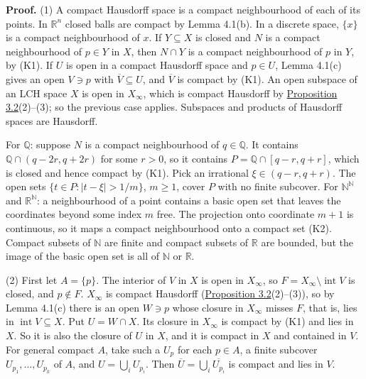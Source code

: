 \documentclass[
  english,
  11pt,
  a4paper,
]{article}
\begin{document}
\textbf{Proof.} (1) A compact Hausdorff space is a compact neighbourhood
of each of its points. In \(\mathbb R^n\) closed balls are compact by
Lemma 4.1(b). In a discrete space, \(\{x\}\) is a compact neighbourhood
of \(x\). If \(Y\subseteq X\) is closed and \(N\) is a compact
neighbourhood of \(p\in Y\) in \(X\), then \(N\cap Y\) is a compact
neighbourhood of \(p\) in \(Y\), by (K1). If \(U\) is open in a compact
Hausdorff space and \(p\in U\), Lemma 4.1(c) gives an open \(V\ni p\)
with \(\overline V\subseteq U\), and \(\overline V\) is compact by (K1).
An open subspace of an LCH space \(X\) is open in \(X_\infty\), which is
compact Hausdorff by
\hyperlink{the-stone-weierstrass-theorem-for-functions-vanishing-at-infinity--oa-fnd-sw-02}{Proposition
3.2}(2)--(3); so the previous case applies. Subspaces and products of
Hausdorff spaces are Hausdorff.

For \(\mathbb Q\): suppose \(N\) is a compact neighbourhood of
\(q\in\mathbb Q\). It contains \(\mathbb Q\cap(q-2r,q+2r)\) for some
\(r>0\), so it contains \(P=\mathbb Q\cap[q-r,q+r]\), which is closed
and hence compact by (K1). Pick an irrational \(\xi\in(q-r,q+r)\). The
open sets \(\{t\in P:|t-\xi|>1/m\}\), \(m\geq1\), cover \(P\) with no
finite subcover. For \(\mathbb N^{\mathbb N}\) and
\(\mathbb R^{\mathbb N}\): a neighbourhood of a point contains a basic
open set that leaves the coordinates beyond some index \(m\) free. The
projection onto coordinate \(m+1\) is continuous, so it maps a compact
neighbourhood onto a compact set (K2). Compact subsets of \(\mathbb N\)
are finite and compact subsets of \(\mathbb R\) are bounded, but the
image of the basic open set is all of \(\mathbb N\) or \(\mathbb R\).

(2) First let \(A=\{p\}\). The interior of \(V\) in \(X\) is open in
\(X_\infty\), so \(F=X_\infty\setminus\operatorname{int}V\) is closed,
and \(p\notin F\). \(X_\infty\) is compact Hausdorff
(\hyperlink{the-stone-weierstrass-theorem-for-functions-vanishing-at-infinity--oa-fnd-sw-02}{Proposition
3.2}(2)--(3)), so by Lemma 4.1(c) there is an open \(W\ni p\) whose
closure in \(X_\infty\) misses \(F\), that is, lies in
\(\operatorname{int}V\subseteq X\). Put \(U=W\cap X\). Its closure in
\(X_\infty\) is compact by (K1) and lies in \(X\). So it is also the
closure of \(U\) in \(X\), and it is compact in \(X\) and contained in
\(V\). For general compact \(A\), take such a \(U_p\) for each
\(p\in A\), a finite subcover \(U_{p_1},\dots,U_{p_k}\) of \(A\), and
\(U=\bigcup_iU_{p_i}\). Then \(\overline U=\bigcup_i\overline{U_{p_i}}\)
is compact and lies in \(V\).
\end{document}
